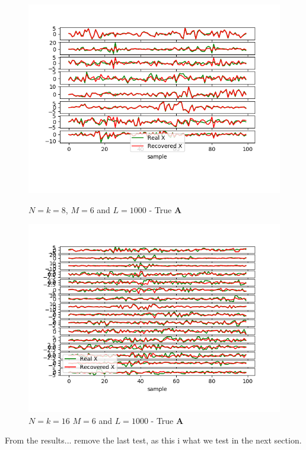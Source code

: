 \begin{figure}[H]
    \begin{minipage}[t]{.45\textwidth}
    	\centering
		\includegraphics[scale=0.5]{figures/ch_6/M-SBL_AR1.png}
		\caption{ $N=k=8$, $M = 6$ and $L=1000$  - True $\textbf{A}$}
		\label{fig:AR1}
    \end{minipage} 
    \hfill
    \begin{minipage}[t]{.45\textwidth}
        \centering
		\includegraphics[scale=0.5]{figures/ch_6/M-SBL_AR2.png}
		\caption{$N=k=16$ $M = 6$ and $L=1000$ - True $\textbf{A}$}
		\label{fig:AR2}
    \end{minipage}
\end{figure}
From the results... remove the last test, as this i what we test in the next section.



% 






 
